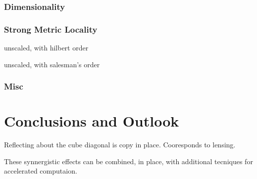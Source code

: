 \documentclass[letterpaper,twocolumn,amsmath,amsfont,amssymb,english,aps,jcp,preprintnumbers,groupaddress,nofootinbib,tightenlines,floatfix]{revtex4}
\theoremstyle{plain}
\theoremstyle{remark}
\theoremstyle{plain}
\begin{document}
\subsubsection{Dimensionality}

\subsubsection{Strong Metric Locality}

unscaled, with hilbert order

unscaled, with salesman's order

\subsubsection{Misc}





\section{Conclusions and Outlook}

Reflecting about the cube diagonal is copy in place.  Cooresponds to lensing.

These  synnergistic effects can be combined, in place, with additional tecniques for 
accelerated computaion.



\end{document}

